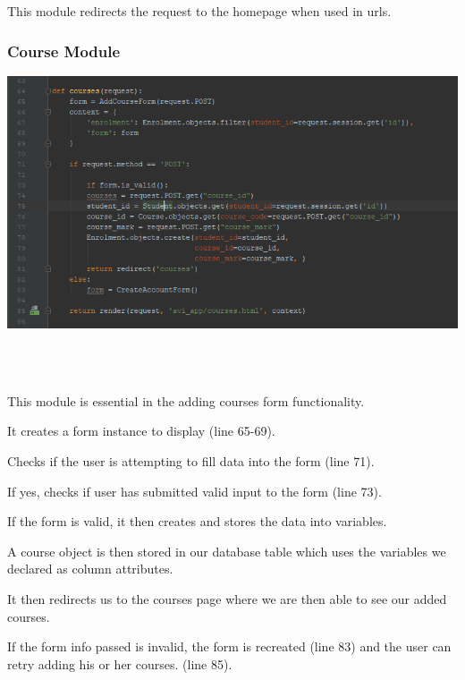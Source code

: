 \documentclass[10pt]{article}
\begin{document}
This module redirects the request to the homepage when used in urls.


\subsubsection{Course Module}

\begin{center}
\includegraphics[width=1.1\textwidth]{p9.png}
\end{center} \\ \\

\begin{description}[font=$\bullet$~\normalfont\scshape\color{red!50!black}]
\item [] This module is essential in the adding courses form functionality. 
\item [] It creates a form instance to display (line 65-69).
\item [] Checks if the user is attempting to fill data into the form (line 71).
\item [] If yes, checks if user has submitted valid input to the form (line 73).
\item [] If the form is valid, it then creates and stores the data into variables.
\item [] A course object is then stored in our database table which uses the variables we declared as column attributes.
\item [] It then redirects us to the courses page where we are then able to see our added courses.
\item [] If the form info passed is invalid, the form is recreated (line 83) and the user can retry adding his or her courses. (line 85).

\end{description}
\end{document}
